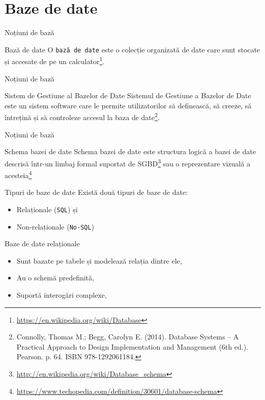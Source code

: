 \documentclass[presentation]{beamer}
\begin{document}
\section{Baze de date}
\label{sec:org963c770}
\begin{frame}[label={sec:org01db716},fragile]{Noțiuni de bază}
 \begin{block}{Bază de date}
\vskip 0.1in
O \texttt{bază de date} este o colecție organizată de date care sunt stocate și accesate de pe un calculator\footnote{\url{https://en.wikipedia.org/wiki/Database}}.
\end{block}
\end{frame}
\begin{frame}[label={sec:org0f17213}]{Noțiuni de bază}
\begin{block}{Sistem de Gestiune al Bazelor de Date}
\vskip 0.1in
Sistemul de Gestiune a Bazelor de Date este un sistem software care le permite utilizatorilor să definească, să creeze, să întrețină și să controleze accesul la baza de date\footnote{Connolly, Thomas M.; Begg, Carolyn E. (2014). Database Systems – A Practical Approach to Design Implementation and Management (6th ed.). Pearson. p. 64. ISBN 978-1292061184.}.
\end{block}
\end{frame}
\begin{frame}[label={sec:org3f2e50b}]{Noțiuni de bază}
\begin{block}{Schema bazei de date}
\vskip 0.1in
Schema bazei de date este structura logică a bazei de date descrisă într-un limbaj formal suportat de SGBD\footnote{\url{http://en.wikipedia.org/wiki/Database\_schema}} sau o reprezentare vizuală a acesteia\footnote{\url{https://www.techopedia.com/definition/30601/database-schema}}
\end{block}
\end{frame}
\begin{frame}[label={sec:org8345456},fragile]{Tipuri de baze de date}
 Există două tipuri de baze de date:
\begin{itemize}
\item Relaționale (\texttt{SQL}) și
\item Non-relaționale (\texttt{No-SQL})
\end{itemize}
\end{frame}
\begin{frame}[label={sec:orgde685f4}]{Baze de date relaționale}
\begin{itemize}
\item Sunt bazate pe tabele și modelează relația dintre ele,
\item Au o schemă predefinită,
\item Suportă interogări complexe,
\end{itemize}
\end{frame}
\end{document}
